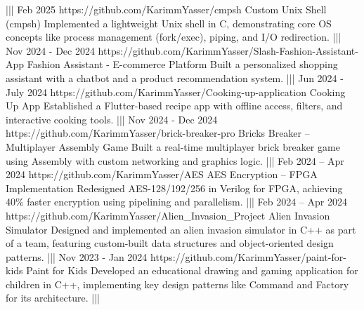 {    |||
    {Feb 2025}%
    {https://github.com/KarimmYasser/cmpsh}%
    {Custom Unix Shell (cmpsh)}%
    {Implemented a lightweight Unix shell in C, demonstrating core OS concepts like process management (fork/exec), piping, and I/O redirection.}%
    |||
    {Nov 2024 - Dec 2024}%
    {https://github.com/KarimmYasser/Slash-Fashion-Assistant-App}%
    {Fashion Assistant - E-commerce Platform}%
    {Built a personalized shopping assistant with a chatbot and a product recommendation system.}%
    |||
    {Jun 2024 - July 2024}%
    {https://github.com/KarimmYasser/Cooking-up-application}%
    {Cooking Up App}%
    {Established a Flutter-based recipe app with offline access, filters, and interactive cooking tools.}%
    |||
    {Nov 2024 - Dec 2024}%
    {https://github.com/KarimmYasser/brick-breaker-pro}%
    {Bricks Breaker – Multiplayer Assembly Game}%
    {Built a real-time multiplayer brick breaker game using Assembly with custom networking and graphics logic.}%
    |||
    {Feb 2024 – Apr 2024}%
    {https://github.com/KarimmYasser/AES}%
    {AES Encryption – FPGA Implementation}%
    {Redesigned AES-128/192/256 in Verilog for FPGA, achieving 40\% faster encryption using pipelining and parallelism.}%
    |||
    {Feb 2024 – Apr 2024}%
    {https://github.com/KarimmYasser/Alien_Invasion_Project}%
    {Alien Invasion Simulator}%
    {Designed and implemented an alien invasion simulator in C++ as part of a team, featuring custom-built data structures and object-oriented design patterns.}%
    |||
    {Nov 2023 - Jan 2024}%
    {https://github.com/KarimmYasser/paint-for-kids}%
    {Paint for Kids}%
    {Developed an educational drawing and gaming application for children in C++, implementing key design patterns like Command and Factory for its architecture.}%
    |||%
}


\newcommand{\programmingLanguages}{Dart, Kotlin, Python, C, C++, Java, TypeScript, JavaScript, SQL, Assembly}

\newcommand{\mobileDevelopment}{Flutter, Android (Kotlin with Jetpack Compose \& XML Views), React Native}

\newcommand{\frameworksLibraries}{Bloc, Riverpod, Provider, GetX, Dagger/Hilt, Navigation Component, Scikit-learn, Pandas, NumPy, Streamlit, Selenium, Tkinter, Room, Retrofit, Firebase, RESTful APIs}

